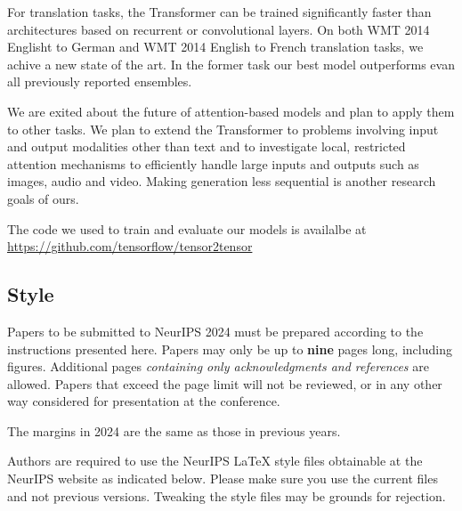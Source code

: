 \documentclass{article}
\begin{document}
For translation tasks, the Transformer can be trained significantly faster than architectures based on recurrent or convolutional layers. 
On both WMT 2014 Englisht to German and WMT 2014 English to French translation tasks, we achive a new state of the art. In the former task our best model outperforms evan all previously reported ensembles.

We are exited about the future of attention-based models and plan to apply them to other tasks.
We plan to extend the Transformer to problems involving input and output modalities other than text and to investigate local, restricted attention mechanisms to efficiently handle large inputs and outputs such as images, audio and video.
Making generation less sequential is another research goals of ours.

The code we used to train and evaluate our models is availalbe at \url{https://github.com/tensorflow/tensor2tensor}

\subsection{Style}


Papers to be submitted to NeurIPS 2024 must be prepared according to the
instructions presented here. Papers may only be up to {\bf nine} pages long,
including figures. Additional pages \emph{containing only acknowledgments and
references} are allowed. Papers that exceed the page limit will not be
reviewed, or in any other way considered for presentation at the conference.


The margins in 2024 are the same as those in previous years.


Authors are required to use the NeurIPS \LaTeX{} style files obtainable at the
NeurIPS website as indicated below. Please make sure you use the current files
and not previous versions. Tweaking the style files may be grounds for
rejection.
\end{document}
